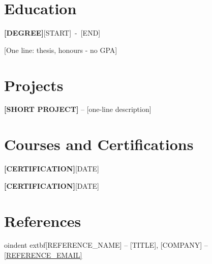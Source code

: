 \documentclass[10pt,letterpaper]{article}
\newcommand{\cventry}[3]{%
    \needspace{5\baselineskip}%
    \par\noindent\textbf{#1}\hfill\mbox{#3}\par\nopagebreak
    \noindent{\color{cvblue}#2}\par\nopagebreak\vspace{1pt}}
\newcommand{\cvline}[3]{%
    \noindent\parbox[t]{0.89\textwidth}{\raggedright\textbf{#1} -- #2}%
    \hfill\parbox[t]{0.1\textwidth}{\raggedleft #3}\par\vspace{1pt}}
\newcommand{\cvcert}[2]{\noindent\textbf{#1}\hfill #2\par}
\begin{document}
\section{Education}
\cventry{[DEGREE]}{[UNIVERSITY], [CITY]}{[START] - [END]}
[One line: thesis, honours - no GPA]\par

\section{Projects}
\cvline{[SHORT PROJECT]}{[one-line description]}{[YEAR]}

\section{Courses and Certifications}
\cvcert{[CERTIFICATION]}{[DATE]}
\cvcert{[CERTIFICATION]}{[DATE]}

\section{References}

oindent	extbf{[REFERENCE_NAME]} -- [TITLE], [COMPANY] -- \href{mailto:[REFERENCE_EMAIL]}{[REFERENCE_EMAIL]}\par
\end{document}
